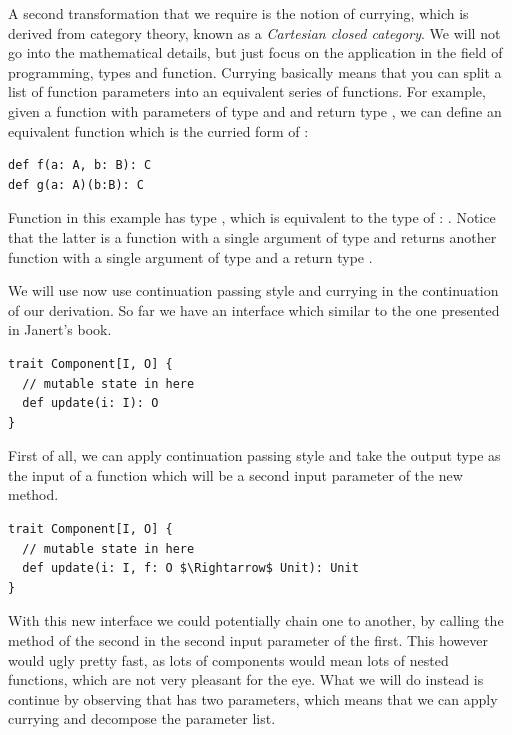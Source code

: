\begin{minipage}{\linewidth} %
A second transformation that we require is the notion of currying, which is derived from category theory, known as a \textit{Cartesian closed category}. We will not go into the mathematical details, but just focus on the application in the field of programming, types and function. Currying basically means that you can split a list of function parameters into an equivalent series of functions. For example, given a function  with parameters of type  and  and return type , we can define an equivalent function  which is the curried form of :

\begin{lstlisting}[style=InlineScalaStyle]
def f(a: A, b: B): C
def g(a: A)(b:B): C
\end{lstlisting}
\end{minipage}

Function  in this example has type , which is equivalent to the type of : . Notice that the latter is a function with a single argument of type  and returns another function with a single argument of type  and a return type .

We will use now use continuation passing style and currying in the continuation of our derivation. So far we have an interface which similar to the one presented in Janert's book.

\begin{lstlisting}[style=InlineScalaStyle]
trait Component[I, O] {
  // mutable state in here
  def update(i: I): O
}
\end{lstlisting}

First of all, we can apply continuation passing style and take the output type  as the input of a function which will be a second input parameter of the new  method.

\begin{lstlisting}[style=InlineScalaStyle]
trait Component[I, O] {
  // mutable state in here
  def update(i: I, f: O $\Rightarrow$ Unit): Unit
}
\end{lstlisting}

With this new interface we could potentially chain one \comp to another, by calling the  method of the second \comp in the second input parameter of the first. This however would ugly pretty fast, as lots of components would mean lots of nested functions, which are not very pleasant for the eye. What we will do instead is continue by observing that  has two parameters, which means that we can apply currying and decompose the parameter list.

